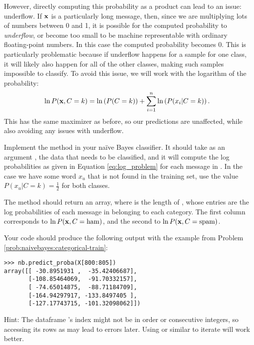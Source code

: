 However, directly computing this probability as a product can lead to an issue: underflow.
If $\mathbf{x}$ is a particularly long message, then, since we are multiplying lots of numbers between 0 and 1, it is possible for the computed probability to \emph{underflow}, or become too small to be machine representable with ordinary floating-point numbers.
In this case the computed probability becomes 0.
This is particularly problematic because if underflow happens for a sample for one class, it will likely also happen for all of the other classes, making such samples impossible to classify.
To avoid this issue, we will work with the logarithm of the probability:
\begin{equation}\label{eq:log_problem}
    \ln P(\mathbf{x},C=k)=\ln\left(P(C=k)\right) + \sum_{i=1}^{n}\ln\left(P(x_i | C=k)\right).
\end{equation}
This has the same maximizer as before, so our predictions are unaffected, while also avoiding any issues with underflow.

\begin{problem}\label{NB:prob_predict_proba}
Implement the  method in your naïve Bayes classifier. 
It should take as an argument , the data that needs to be classified, and it will compute the log probabilities as given in Equation \ref{eq:log_problem} for each message in .
In the case we have some word $x_u$ that is not found in the training set, use the value $P(x_u|C=k)=\frac{1}{2}$ for both classes.

The method should return an  array, where  is the length of , whose entries are the log probabilities of each message  in  belonging to each category.
The first column corresponds to $\ln P(\mathbf{x}, C=\text{ham})$, and the second to $\ln P(\mathbf{x}, C=\text{spam})$.

Your code should produce the following output with the example from Problem \ref{prob:naivebayes:categorical-train}:
\begin{lstlisting}
>>> nb.predict_proba(X[800:805])
array([[ -30.8951931 ,  -35.42406687],
       [-108.85464069,  -91.70332157],
       [ -74.65014875,  -88.71184709],
       [-164.94297917, -133.8497405 ],
       [-127.17743715, -101.32098062]])
\end{lstlisting}

Hint: The dataframe 's index might not be in order or consecutive integers, so accessing its rows as  may lead to errors later. Using  or similar to iterate will work better.
\end{problem}

